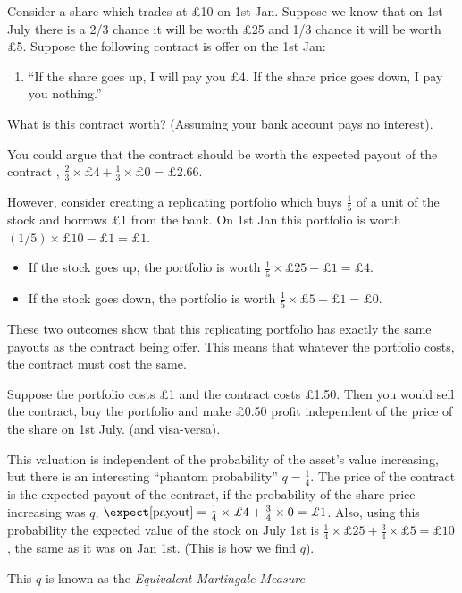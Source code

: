 \documentclass[11pt,a4paper]{article}
\begin{document}
  \begin{example}{}
    Consider a share which trades at £10 on 1st Jan. Suppose we know that on 1st July there is a 2/3 chance it will be worth £25 and 1/3 chance it will be worth £5. Suppose the following contract is offer on the 1st Jan:
    \begin{enumerate}
      \item ``If the share goes up, I will pay you £4. If the share price goes down, I pay you nothing.''
    \end{enumerate}
    What is this contract worth? (Assuming your bank account pays no interest).
    \par You could argue that the contract should be worth the expected payout of the contract , $\frac23\times\pounds4+\frac13\times\pounds0=\pounds2.66$.
    \par However, consider creating a replicating portfolio which buys $\frac15$ of a unit of the stock and borrows £1 from the bank. On 1st Jan this portfolio is worth $(1/5)\times\pounds10-\pounds1=\pounds1$.
    \begin{itemize}
      \item If the stock goes up, the portfolio is worth $\frac15\times\pounds25-\pounds1=\pounds4$.
      \item If the stock goes down, the portfolio is worth $\frac15\times\pounds5-\pounds1=\pounds0$.
    \end{itemize}
    These two outcomes show that this replicating portfolio has exactly the same payouts as the contract being offer. This means that whatever the portfolio costs, the contract must cost the same.
    \par Suppose the portfolio costs £1 and the contract costs £1.50. Then you would sell the contract, buy the portfolio and make £0.50 profit independent of the price of the share on 1st July. (and visa-versa).
    \par This valuation is independent of the probability of the asset's value increasing, but there is an interesting ``phantom probability'' $q=\frac14$. The price of the contract is the expected payout of the contract, if the probability of the share price increasing was $q$, $\expect[\text{payout}]=\frac14\times\pounds4+\frac34\times0=\pounds1$. Also, using this probability the expected value of the stock on July 1st is $\frac14\times\pounds25+\frac34\times\pounds5=\pounds10$, the same as it was on Jan 1st. (This is how we find $q$).
    \par This $q$ is known as the \textit{Equivalent Martingale Measure}
  \end{example}
\end{document}

